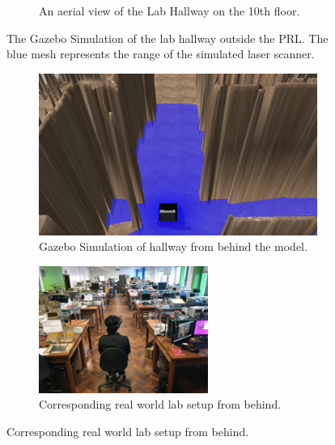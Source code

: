 \begin{figure}[ht]
\begin{subfigure}[b]{.48\textwidth}
		\caption{An aerial view of the Lab Hallway on the 10th floor.}
	\end{subfigure}
	\vspace{-1\baselineskip}
	\begin{center}
		\caption{The Gazebo Simulation of the lab hallway outside the PRL. The blue mesh represents the range of the simulated laser scanner.}
		\label{fig:greenredrender}
	\end{center}
	\vspace{-1\baselineskip}
\end{figure}

\begin{figure}[ht!]
	\begin{subfigure}[b]{.48\textwidth}
		\centering
		\includegraphics[width=1.0\linewidth]{img/chapter6_test/gazeboBack.jpg}
		\caption{Gazebo Simulation of hallway from behind the model.}
	\end{subfigure}%
	\hspace{\fill} 
	\begin{subfigure}[b]{.48\textwidth}
		\centering
		\includegraphics[width=1.0\linewidth,height=41.5mm]{img/chapter6_test/realBack.jpg}
		\caption{Corresponding real world lab setup from behind.}
	\end{subfigure}


\end{figure}

